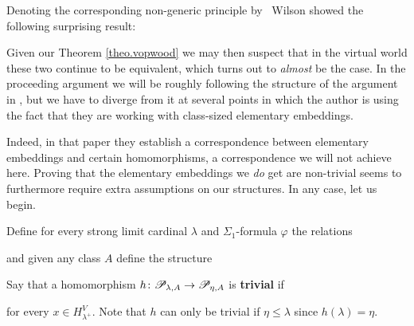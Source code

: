 \documentclass[../../main]{subfiles}
\begin{document}
Denoting the corresponding non-generic principle by \wvp\, Wilson showed the following surprising result:


Given our Theorem \ref{theo.vopwood} we may then suspect that in the virtual world these two continue to be equivalent, which turns out to \textit{almost} be the case. In the proceeding argument we will be roughly following the structure of the argument in \cite{WilsonWVP}, but we have to diverge from it at several points in which the author is using the fact that they are working with class-sized elementary embeddings. 

\qquad Indeed, in that paper they establish a correspondence between elementary embeddings and certain homomorphisms, a correspondence we will not achieve here. Proving that the elementary embeddings we \textit{do} get are non-trivial seems to furthermore require extra assumptions on our structures. In any case, let us begin.

\qquad Define for every strong limit cardinal $\lambda$ and $\Sigma_1$-formula $\varphi$ the relations

and given any class $A$ define the structure

Say that a homomorphism $h\colon\mathscr P_{\lambda,A}\to\mathscr P_{\eta,A}$ is \textbf{trivial} if
  
  for every $x\in H_{\lambda^+}^V$. Note that $h$ can only be trivial if $\eta\leq\lambda$ since $h(\lambda)=\eta$.
\end{document}
